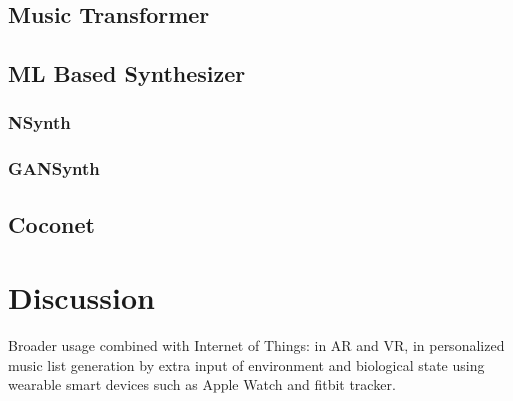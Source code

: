 \documentclass[man]{apa6}
\begin{document}
\subsection{Music Transformer}
\lipsum[6]

\subsection{ML Based Synthesizer}
\lipsum[8]

\subsubsection{NSynth}
\lipsum[2]

\subsubsection{GANSynth}
\lipsum[9]

\subsection{Coconet}
\lipsum[10]

\section{Discussion}

Broader usage combined with Internet of Things: in AR and VR, in personalized music list generation by extra input of environment and biological state using wearable smart devices such as Apple Watch and fitbit tracker.

\lipsum[11]

\printbibliography
\end{document}

